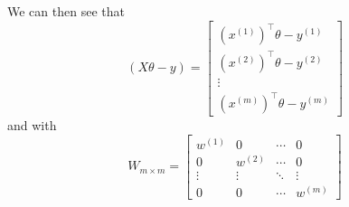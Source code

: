 We can then see that
\begin{equation*}
    (X \theta - y)
    =
    \begin{bmatrix}
        {\left(x^{(1)}\right)}^\top \theta
        - y^{(1)}
        \\
        {\left(x^{(2)}\right)}^\top \theta
        - y^{(2)}
        \\
        \vdots
        \\
        {\left(x^{(m)}\right)}^\top \theta
        - y^{(m)}
    \end{bmatrix}
\end{equation*}
and with
\begin{equation*}
    W_{m \times m}
    =
    \begin{bmatrix}
        w^{(1)} & 0       & \cdots & 0       \\
        0       & w^{(2)} & \cdots & 0       \\
        \vdots  & \vdots  & \ddots & \vdots  \\
        0       & 0       & \cdots & w^{(m)}
    \end{bmatrix}
\end{equation*}
